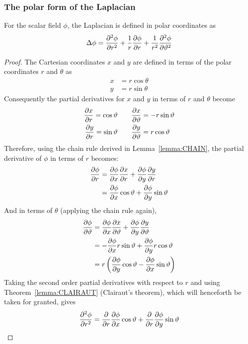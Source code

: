 \subsubsection{The polar form of the Laplacian}
\begin{lemma}
    For the scalar field $\phi$, the Laplacian is defined in polar coordinates as
    $$\Delta\phi=\pdv[2]{\phi}{r}+\frac{1}{r}\pdv{\phi}{r}+\frac{1}{r^2}\pdv[2]{\phi}{\vartheta}$$

    \begin{proof}
        The Cartesian coordinates $x$ and $y$ are defined in terms of the polar coordinates $r$ and $\theta$ as
        \begin{align*}
            x&=r\cos\theta\\
            y&=r\sin\theta
        \end{align*}
        Consequently the partial derivatives for $x$ and $y$ in terms of $r$ and $\theta$ become
        \begin{align*}
            \pdv{x}{r}=\cos\vartheta\quad&\quad\pdv{x}{\vartheta}=-r\sin\vartheta\\
            \pdv{y}{r}=\sin\vartheta\quad&\quad\pdv{y}{\vartheta}=r\cos\vartheta
        \end{align*} 
        Therefore, using the chain rule derived in Lemma~\ref{lemma:CHAIN}, the partial derivative of $\phi$ in terms of $r$ becomes:
        \begin{align}
            \notag\pdv{\phi}{r}&=\pdv{\phi}{x}\pdv{x}{r}+\pdv{\phi}{y}\pdv{y}{r}\\
            \label{equation:polar-laplacian:1}&=\pdv{\phi}{x}\cos\vartheta+\pdv{\phi}{y}\sin\vartheta
        \end{align}
        And in terms of $\theta$ (applying the chain rule again),
        \begin{align}
            \notag\pdv{\phi}{\vartheta}&=\pdv{\phi}{x}\pdv{x}{\vartheta}+\pdv{\phi}{y}\pdv{y}{\vartheta}\\
            \notag&=-\pdv{\phi}{x}r\sin\vartheta+\pdv{\phi}{y}r\cos\vartheta\\
            \label{equation:polar-laplacian:2}&=r\left(\pdv{\phi}{y}\cos\vartheta-\pdv{\phi}{x}\sin\vartheta\right)
        \end{align}
        Taking the second order partial derivatives with respect to $r$ and using Theorem~\ref{lemma:CLAIRAUT} (Clairaut's theorem), which will henceforth be taken for granted, gives
        \begin{align*}
            \pdv[2]{\phi}{r}&=\pdv{r}\pdv{\phi}{x}\cos\theta+\pdv{r}\pdv{\phi}{y}\sin\theta\\

\end{align*}
\end{proof}
\end{lemma}
